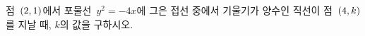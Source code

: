 점~$(2{,}\mkern3mu\mathopen{}1)$에서 포물선~$y^2=-4x$에 그은 접선 중에서 기울기가 양수인 직선이 점~$(4{,}\mkern3mu\mathopen{}k)$를 지날 때, $k$의 값을 구하시오.
